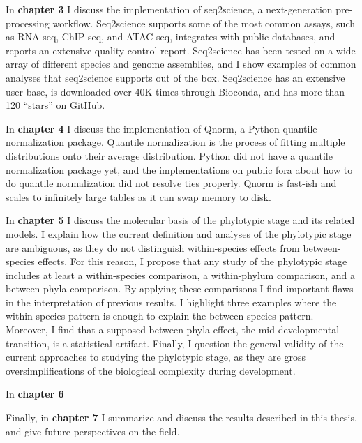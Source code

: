 In \textbf{chapter 3} I discuss the implementation of seq2science, a next-generation pre-processing workflow. Seq2science supports some of the most common assays, such as RNA-seq, ChIP-seq, and ATAC-seq, integrates with public databases, and reports an extensive quality control report. Seq2science has been tested on a wide array of different species and genome assemblies, and I show examples of common analyses that seq2science supports out of the box. Seq2science has an extensive user base\cite{Bright_2021,Xu_2020,Wester2021,SantosBarriopedro2021,Heuts2023,Tholen2023,Harlaar2022,LunaVelez2023,Neikes2023,Vierboom2021,Smits2020,Smits2022,Heuts2022,Rother2023}, is downloaded over 40K times through Bioconda, and has more than 120 ``stars'' on GitHub.

In \textbf{chapter 4} I discuss the implementation of Qnorm, a Python quantile normalization package. Quantile normalization is the process of fitting multiple distributions onto their average distribution. Python did not have a quantile normalization package yet, and the implementations on public fora about how to do quantile normalization did not resolve ties properly. Qnorm is fast-ish and scales to infinitely large tables as it can swap memory to disk.

In \textbf{chapter 5} I discuss the molecular basis of the phylotypic stage and its related models. I explain how the current definition and analyses of the phylotypic stage are ambiguous, as they do not distinguish within-species effects from between-species effects. For this reason, I propose that any study of the phylotypic stage includes at least a within-species comparison, a within-phylum comparison, and a between-phyla comparison. By applying these comparisons I find important flaws in the interpretation of previous results. I highlight three examples where the within-species pattern is enough to explain the between-species pattern. Moreover, I find that a supposed between-phyla effect, the mid-developmental transition, is a statistical artifact. Finally, I question the general validity of the current approaches to studying the phylotypic stage, as they are gross oversimplifications of the biological complexity during development.

In \textbf{chapter 6} 

Finally, in \textbf{chapter 7} I summarize and discuss the results described in this thesis, and give future perspectives on the field.
